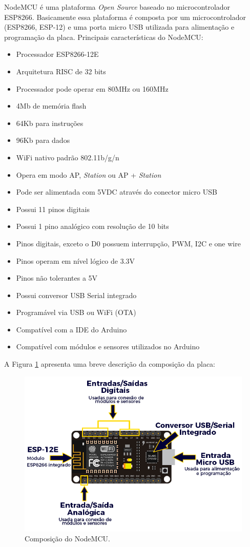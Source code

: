 NodeMCU é uma plataforma \textit{Open Source} baseado no microcontrolador ESP8266. Basicamente essa plataforma é composta por um microcontrolador (ESP8266, ESP-12) e uma porta micro USB utilizada para alimentação e programação da placa. Principais características do NodeMCU:
\begin{itemize}
\item Processador ESP8266-12E
\item Arquitetura RISC de 32 bits
\item Processador pode operar em 80MHz ou 160MHz
\item 4Mb de memória flash
\item 64Kb para instruções
\item 96Kb para dados
\item WiFi nativo padrão 802.11b/g/n
\item Opera em modo AP, \textit{Station} ou AP + \textit{Station}
\item Pode ser alimentada com 5VDC através do conector micro USB
\item Possui 11 pinos digitais
\item Possui 1 pino analógico com resolução de 10 bits
\item Pinos digitais, exceto o D0 possuem interrupção, PWM, I2C e one wire
\item Pinos operam em nível lógico de 3.3V
\item Pinos não tolerantes a 5V
\item Possui conversor USB Serial integrado
\item Programável via USB ou WiFi (OTA)
\item Compatível com a IDE do Arduino
\item Compatível com módulos e sensores utilizados no Arduino
\end{itemize}

A Figura \ref{fig:nodemcu} apresenta uma breve descrição da composição da placa:

\begin{figure}[H]
\centering
\includegraphics[scale=0.6]{./04-figuras/nodemcu.png}
\caption{Composição do NodeMCU.}
\vspace{-\baselineskip}
\label{fig:nodemcu}
\end{figure}

